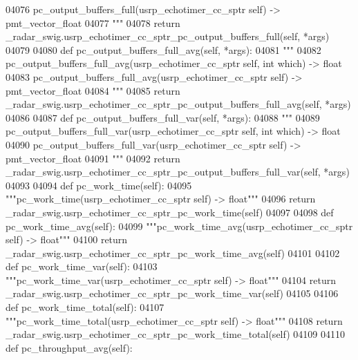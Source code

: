 \begin{DoxyCode}
{{{{{{{{{{{{{{04076 \textcolor{stringliteral}{        pc\_output\_buffers\_full(usrp\_echotimer\_cc\_sptr self) -> pmt\_vector\_float}
04077 \textcolor{stringliteral}{        """}
04078         \textcolor{keywordflow}{return} \_radar\_swig.usrp\_echotimer\_cc\_sptr\_pc\_output\_buffers\_full(self, *args)
04079 
04080     \textcolor{keyword}{def }pc_output_buffers_full_avg(self, *args):
04081         \textcolor{stringliteral}{"""}
04082 \textcolor{stringliteral}{        pc\_output\_buffers\_full\_avg(usrp\_echotimer\_cc\_sptr self, int which) -> float}
04083 \textcolor{stringliteral}{        pc\_output\_buffers\_full\_avg(usrp\_echotimer\_cc\_sptr self) -> pmt\_vector\_float}
04084 \textcolor{stringliteral}{        """}
04085         \textcolor{keywordflow}{return} \_radar\_swig.usrp\_echotimer\_cc\_sptr\_pc\_output\_buffers\_full\_avg(self, *args)
04086 
04087     \textcolor{keyword}{def }pc_output_buffers_full_var(self, *args):
04088         \textcolor{stringliteral}{"""}
04089 \textcolor{stringliteral}{        pc\_output\_buffers\_full\_var(usrp\_echotimer\_cc\_sptr self, int which) -> float}
04090 \textcolor{stringliteral}{        pc\_output\_buffers\_full\_var(usrp\_echotimer\_cc\_sptr self) -> pmt\_vector\_float}
04091 \textcolor{stringliteral}{        """}
04092         \textcolor{keywordflow}{return} \_radar\_swig.usrp\_echotimer\_cc\_sptr\_pc\_output\_buffers\_full\_var(self, *args)
04093 
04094     \textcolor{keyword}{def }pc_work_time(self):
04095         \textcolor{stringliteral}{"""pc\_work\_time(usrp\_echotimer\_cc\_sptr self) -> float"""}
04096         \textcolor{keywordflow}{return} \_radar\_swig.usrp\_echotimer\_cc\_sptr\_pc\_work\_time(self)
04097 
04098     \textcolor{keyword}{def }pc_work_time_avg(self):
04099         \textcolor{stringliteral}{"""pc\_work\_time\_avg(usrp\_echotimer\_cc\_sptr self) -> float"""}
04100         \textcolor{keywordflow}{return} \_radar\_swig.usrp\_echotimer\_cc\_sptr\_pc\_work\_time\_avg(self)
04101 
04102     \textcolor{keyword}{def }pc_work_time_var(self):
04103         \textcolor{stringliteral}{"""pc\_work\_time\_var(usrp\_echotimer\_cc\_sptr self) -> float"""}
04104         \textcolor{keywordflow}{return} \_radar\_swig.usrp\_echotimer\_cc\_sptr\_pc\_work\_time\_var(self)
04105 
04106     \textcolor{keyword}{def }pc_work_time_total(self):
04107         \textcolor{stringliteral}{"""pc\_work\_time\_total(usrp\_echotimer\_cc\_sptr self) -> float"""}
04108         \textcolor{keywordflow}{return} \_radar\_swig.usrp\_echotimer\_cc\_sptr\_pc\_work\_time\_total(self)
04109 
04110     \textcolor{keyword}{def }pc_throughput_avg(self):
}}}}}}}}}}}}}}
\end{DoxyCode}
